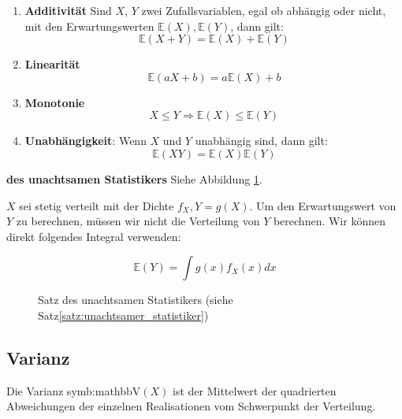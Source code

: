 {    \begin{enumerate}[1)]
        \item \textbf{Additivität} Sind $X$, $Y$ zwei Zufallsvariablen, egal ob abhängig oder nicht, mit den
            Erwartungswerten $\mathbb E\left(X\right),\mathbb E\left(Y\right)$, dann gilt:
            \[\mathbb E\left(X+Y\right)=\mathbb E\left(X\right)+\mathbb E(Y)\]
        \item \textbf{Linearität}
            \[\mathbb E\left(aX+b\right)=a\mathbb E\left(X\right)+b\]
        \item \textbf{Monotonie}
            \[X\le Y\Rightarrow \mathbb E\left(X\right)\le \mathbb E(Y)\]
        \item \textbf{Unabhängigkeit}: Wenn $X$ und $Y$ unabhängig sind, dann gilt:
            \[\mathbb E\left(XY\right)=\mathbb E\left(X\right)\mathbb E(Y)\]
    \end{enumerate}

    \begin{satz}\label{satz:unachtsamer_statistiker} \textbf{des unachtsamen Statistikers}
    Siehe Abbildung \ref{fig:unachtsamer_statistiker}.

    $X$ sei stetig verteilt mit der Dichte $f_{X},Y=g\left(X\right)$.
    Um den Erwartungswert von $Y$ zu berechnen, müssen wir nicht die Verteilung von $Y$ berechnen. Wir können
    direkt folgendes Integral verwenden:

    \[\mathbb E\left(Y\right)=\int {g\left(x\right)f_{X}(x)}dx\]

    \end{satz}
    \begin{figure}
    \centering
        \begin{tikzpicture}
            
        \end{tikzpicture}
        \caption{Satz des unachtsamen Statistikers (siehe Satz\ref{satz:unachtsamer_statistiker})}
        \label{fig:unachtsamer_statistiker}
    \end{figure}

    \subsection{Varianz}
    \label{sec:varianz}
    \begin{definition}
    Die Varianz \gls{symb:mathbbV}$(X)$ ist der Mittelwert der quadrierten Abweichungen der
    einzelnen Realisationen vom Schwerpunkt der Verteilung.


\end{definition}}
